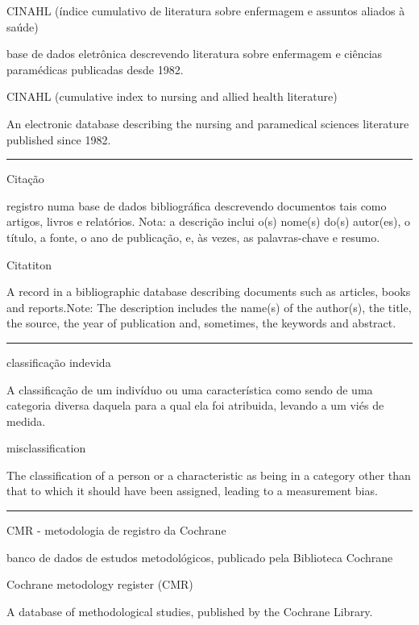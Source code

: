 \documentclass[
]{book}
\begin{document}
CINAHL (índice cumulativo de literatura sobre enfermagem e assuntos aliados à saúde)

base de dados eletrônica descrevendo literatura sobre enfermagem e ciências paramédicas publicadas desde 1982.

CINAHL (cumulative index to nursing and allied health literature)

An electronic database describing the nursing and paramedical sciences literature published since 1982.

\begin{center}\rule{0.5\linewidth}{0.5pt}\end{center}

Citação

registro numa base de dados bibliográfica descrevendo documentos tais como artigos, livros e relatórios. Nota: a descrição inclui o(s) nome(s) do(s) autor(es), o título, a fonte, o ano de publicação, e, às vezes, as palavras-chave e resumo.

Citatiton

A record in a bibliographic database describing documents such as articles, books and reports.Note: The description includes the name(s) of the author(s), the title, the source, the year of publication and, sometimes, the keywords and abstract.

\begin{center}\rule{0.5\linewidth}{0.5pt}\end{center}

classificação indevida

A classificação de um indivíduo ou uma característica como sendo de uma categoria diversa daquela para a qual ela foi atribuida, levando a um viés de medida.

misclassification

The classification of a person or a characteristic as being in a category other than that to which it should have been assigned, leading to a measurement bias.

\begin{center}\rule{0.5\linewidth}{0.5pt}\end{center}

CMR - metodologia de registro da Cochrane

banco de dados de estudos metodológicos, publicado pela Biblioteca Cochrane

Cochrane metodology register (CMR)

A database of methodological studies, published by the Cochrane Library.
\end{document}
